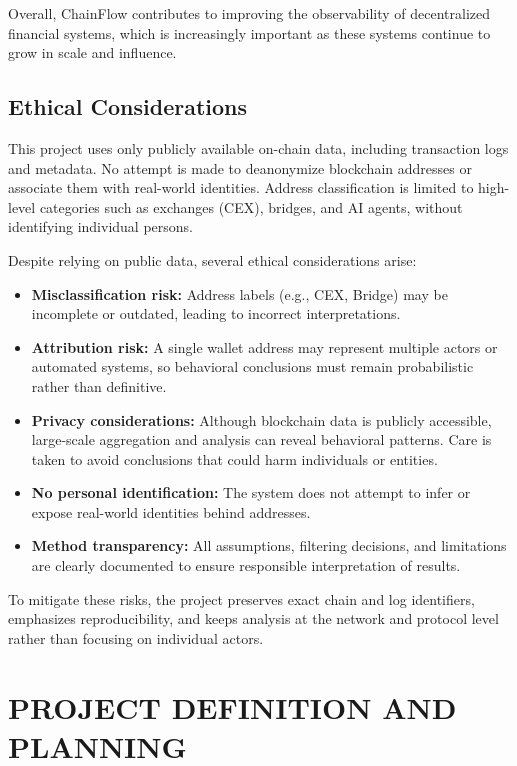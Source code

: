 \documentclass[a4paper,12pt]{report}
\begin{document}
Overall, ChainFlow contributes to improving the observability of decentralized financial systems,
which is increasingly important as these systems continue to grow in scale and influence.

\section{Ethical Considerations}

This project uses only publicly available on-chain data, including transaction logs and metadata.
No attempt is made to deanonymize blockchain addresses or associate them with real-world identities.
Address classification is limited to high-level categories such as exchanges (CEX), bridges, and
AI agents, without identifying individual persons.

Despite relying on public data, several ethical considerations arise:

\begin{itemize}
\item \textbf{Misclassification risk:} Address labels (e.g., CEX, Bridge) may be incomplete or
outdated, leading to incorrect interpretations.
\item \textbf{Attribution risk:} A single wallet address may represent multiple actors or automated
systems, so behavioral conclusions must remain probabilistic rather than definitive.
\item \textbf{Privacy considerations:} Although blockchain data is publicly accessible, large-scale
aggregation and analysis can reveal behavioral patterns. Care is taken to avoid conclusions that
could harm individuals or entities.
\item \textbf{No personal identification:} The system does not attempt to infer or expose real-world
identities behind addresses.
\item \textbf{Method transparency:} All assumptions, filtering decisions, and limitations are clearly
documented to ensure responsible interpretation of results.
\end{itemize}

To mitigate these risks, the project preserves exact chain and log identifiers, emphasizes
reproducibility, and keeps analysis at the network and protocol level rather than focusing on
individual actors.

\chapter{PROJECT DEFINITION AND PLANNING}
\end{document}
